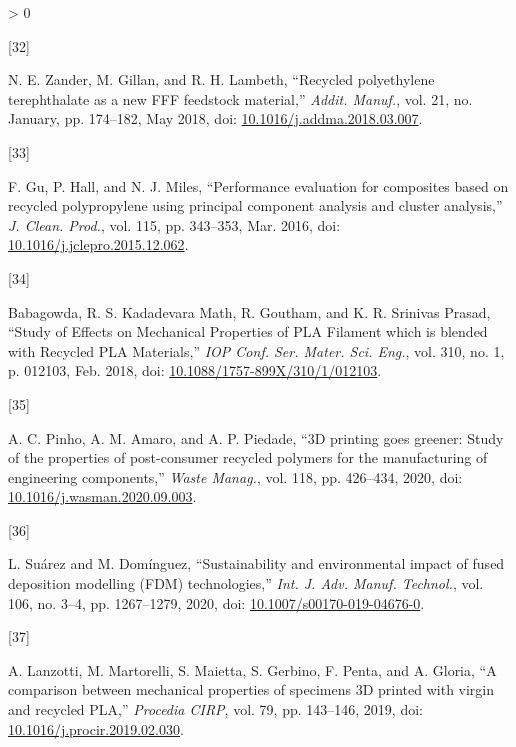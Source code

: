 \documentclass[conference,final,]{IEEEtran}
\newlength{\csllabelwidth}
\newlength{\cslhangindent}
\newenvironment{CSLReferences}[3] %
 {%
  \setlength{\parindent}{0pt}
  \ifodd #1 \everypar{\setlength{\hangindent}{\cslhangindent}}\ignorespaces\fi
  \ifnum #2 > 0
  \setlength{\parskip}{#2\baselineskip}
  \fi
 }%
 {}
\newcommand{\CSLLeftMargin}[1]{\parbox[t]{\csllabelwidth}{#1}}
\newcommand{\CSLRightInline}[1]{\parbox[t]{\linewidth - \csllabelwidth}{#1}}
\begin{document}
\begin{CSLReferences}{0}{0}
\leavevmode\hypertarget{ref-Zander2018}{}%
\CSLLeftMargin{{[}32{]} }
\CSLRightInline{N. E. Zander, M. Gillan, and R. H. Lambeth, {``{Recycled
polyethylene terephthalate as a new FFF feedstock material},''}
\emph{Addit. Manuf.}, vol. 21, no. January, pp. 174--182, May 2018, doi:
\href{https://doi.org/10.1016/j.addma.2018.03.007}{10.1016/j.addma.2018.03.007}.}

\leavevmode\hypertarget{ref-Gu2016}{}%
\CSLLeftMargin{{[}33{]} }
\CSLRightInline{F. Gu, P. Hall, and N. J. Miles, {``{Performance
evaluation for composites based on recycled polypropylene using
principal component analysis and cluster analysis},''} \emph{J. Clean.
Prod.}, vol. 115, pp. 343--353, Mar. 2016, doi:
\href{https://doi.org/10.1016/j.jclepro.2015.12.062}{10.1016/j.jclepro.2015.12.062}.}

\leavevmode\hypertarget{ref-Babagowda2018}{}%
\CSLLeftMargin{{[}34{]} }
\CSLRightInline{Babagowda, R. S. Kadadevara Math, R. Goutham, and K. R.
Srinivas Prasad, {``{Study of Effects on Mechanical Properties of PLA
Filament which is blended with Recycled PLA Materials},''} \emph{IOP
Conf. Ser. Mater. Sci. Eng.}, vol. 310, no. 1, p. 012103, Feb. 2018,
doi:
\href{https://doi.org/10.1088/1757-899X/310/1/012103}{10.1088/1757-899X/310/1/012103}.}

\leavevmode\hypertarget{ref-Pinho2020}{}%
\CSLLeftMargin{{[}35{]} }
\CSLRightInline{A. C. Pinho, A. M. Amaro, and A. P. Piedade, {``{3D
printing goes greener: Study of the properties of post-consumer recycled
polymers for the manufacturing of engineering components},''}
\emph{Waste Manag.}, vol. 118, pp. 426--434, 2020, doi:
\href{https://doi.org/10.1016/j.wasman.2020.09.003}{10.1016/j.wasman.2020.09.003}.}

\leavevmode\hypertarget{ref-Suarez2020}{}%
\CSLLeftMargin{{[}36{]} }
\CSLRightInline{L. Suárez and M. Domínguez, {``{Sustainability and
environmental impact of fused deposition modelling (FDM)
technologies},''} \emph{Int. J. Adv. Manuf. Technol.}, vol. 106, no.
3--4, pp. 1267--1279, 2020, doi:
\href{https://doi.org/10.1007/s00170-019-04676-0}{10.1007/s00170-019-04676-0}.}

\leavevmode\hypertarget{ref-Lanzotti2019}{}%
\CSLLeftMargin{{[}37{]} }
\CSLRightInline{A. Lanzotti, M. Martorelli, S. Maietta, S. Gerbino, F.
Penta, and A. Gloria, {``{A comparison between mechanical properties of
specimens 3D printed with virgin and recycled PLA},''} \emph{Procedia
CIRP}, vol. 79, pp. 143--146, 2019, doi:
\href{https://doi.org/10.1016/j.procir.2019.02.030}{10.1016/j.procir.2019.02.030}.}


\end{CSLReferences}
\end{document}
